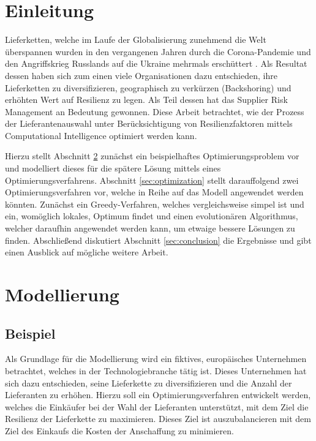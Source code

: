 
\section{Einleitung}

Lieferketten, welche im Laufe der Globalisierung zunehmend die Welt überspannen wurden in den vergangenen Jahren durch die Corona-Pandemie und den Angriffskrieg Russlands auf die Ukraine mehrmals erschüttert \parencite{linton_coronavirus_2020}.
Als Resultat dessen haben sich zum einen viele Organisationen dazu entschieden, ihre Lieferketten zu diversifizieren, geographisch zu verkürzen (Backshoring) und erhöhten Wert auf Resilienz zu legen.
Als Teil dessen hat das Supplier Risk Management an Bedeutung gewonnen.
Diese Arbeit betrachtet, wie der Prozess der Lieferantenauswahl unter Berücksichtigung von Resilienzfaktoren mittels Computational Intelligence optimiert werden kann.

Hierzu stellt Abschnitt \ref{sec:modeling} zunächst ein beispielhaftes Optimierungsproblem vor und modelliert dieses für die spätere Lösung mittels eines Optimierungsverfahrens.
Abschnitt \ref{sec:optimization} stellt darauffolgend zwei Optimierungsverfahren vor, welche in Reihe auf das Modell angewendet werden könnten.
Zunächst ein Greedy-Verfahren, welches vergleichsweise simpel ist und ein, womöglich lokales, Optimum findet und einen evolutionären Algorithmus, welcher daraufhin angewendet werden kann, um etwaige bessere Lösungen zu finden.
Abschließend diskutiert Abschnitt \ref{sec:conclusion} die Ergebnisse und gibt einen Ausblick auf mögliche weitere Arbeit.

\section{Modellierung}\label{sec:modeling}

\subsection{Beispiel}\label{subsec:example}

Als Grundlage für die Modellierung wird ein fiktives, europäisches Unternehmen betrachtet, welches in der Technologiebranche tätig ist.
Dieses Unternehmen hat sich dazu entschieden, seine Lieferkette zu diversifizieren und die Anzahl der Lieferanten zu erhöhen.
Hierzu soll ein Optimierungsverfahren entwickelt werden, welches die Einkäufer bei der Wahl der Lieferanten unterstützt, mit dem Ziel die Resilienz der Lieferkette zu maximieren.
Dieses Ziel ist auszubalancieren mit dem Ziel des Einkaufs die Kosten der Anschaffung zu minimieren.


